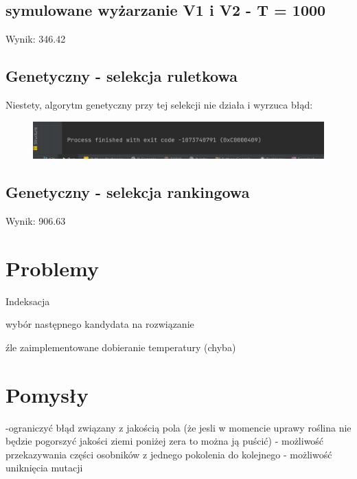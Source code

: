\documentclass{article}
\begin{document}
\subsection{symulowane wyżarzanie V1 i V2  - T = 1000}
Wynik: 346.42

\subsection{Genetyczny - selekcja ruletkowa}
Niestety, algorytm genetyczny przy tej selekcji nie działa i wyrzuca błąd:

\begin{figure}[H]
	\centering
	\includegraphics[width=0.7\linewidth]{screens/error_roullette}
	\caption{}
	\label{fig:errorroullette}
\end{figure}


\subsection{Genetyczny - selekcja rankingowa}
Wynik: 906.63



\section{Problemy}
Indeksacja

wybór następnego kandydata na rozwiązanie

źle zaimplementowane dobieranie temperatury (chyba)
\section{Pomysły}
-ograniczyć błąd związany z jakością pola (że jesli w momencie uprawy roślina nie będzie pogorszyć jakości ziemi poniżej zera to można ją puścić)
- możliwość przekazywania części osobników z jednego pokolenia do kolejnego
- możliwość uniknięcia mutacji
\end{document}
